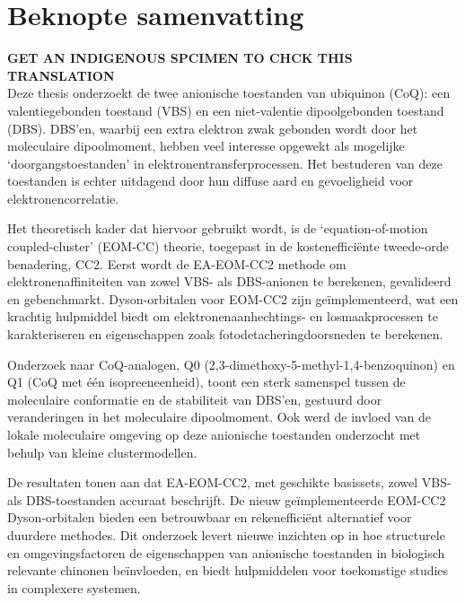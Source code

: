 \chapter{Beknopte samenvatting}

\textbf{GET AN INDIGENOUS SPCIMEN TO CHCK THIS TRANSLATION}\\
Deze thesis onderzoekt de twee anionische toestanden van ubiquinon (CoQ): een valentiegebonden toestand (VBS) en een niet-valentie dipoolgebonden toestand (DBS). DBS'en, waarbij een extra elektron zwak gebonden wordt door het moleculaire dipoolmoment, hebben veel interesse opgewekt als mogelijke `doorgangstoestanden' in elektronentransferprocessen. Het bestuderen van deze toestanden is echter uitdagend door hun diffuse aard en gevoeligheid voor elektronencorrelatie.

Het theoretisch kader dat hiervoor gebruikt wordt, is de `equation-of-motion coupled-cluster' (EOM-CC) theorie, toegepast in de kostenefficiënte tweede-orde benadering, CC2. Eerst wordt de EA-EOM-CC2 methode om elektronenaffiniteiten van zowel VBS- als DBS-anionen te berekenen, gevalideerd en gebenchmarkt. Dyson-orbitalen voor EOM-CC2 zijn geïmplementeerd, wat een krachtig hulpmiddel biedt om elektronenaanhechtings- en losmaakprocessen te karakteriseren en eigenschappen zoals fotodetacheringdoorsneden te berekenen.

Onderzoek naar CoQ-analogen, Q0 (2,3-dimethoxy-5-methyl-1,4-benzoquinon) en Q1 (CoQ met één isopreeneenheid), toont een sterk samenspel tussen de moleculaire conformatie en de stabiliteit van DBS'en, gestuurd door veranderingen in het moleculaire dipoolmoment. Ook werd de invloed van de lokale moleculaire omgeving op deze anionische toestanden onderzocht met behulp van kleine clustermodellen.

De resultaten tonen aan dat EA-EOM-CC2, met geschikte basissets, zowel VBS- als DBS-toestanden accuraat beschrijft. De nieuw ge{\"i}mplementeerde EOM-CC2 Dyson-orbitalen bieden een betrouwbaar en rekenefficiënt alternatief voor duurdere methodes. Dit onderzoek levert nieuwe inzichten op in hoe structurele en omgevingsfactoren de eigenschappen van anionische toestanden in biologisch relevante chinonen beïnvloeden, en biedt hulpmiddelen voor toekomstige studies in complexere systemen.

\cleardoublepage

